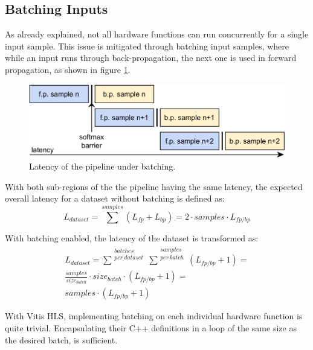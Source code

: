 \subsection{Batching Inputs}
As already explained, not all hardware functions can run concurrently for a single input sample. This issue is mitigated through batching input samples, where while an input runs through back-propagation, the next one is used in forward propagation, as shown in figure \ref{fig: Batching Pipeline latency}. %

\begin{figure}[H]
    \centering
        \includegraphics[width=\textwidth]{Images/diagrams/pipeline_under_batching.png}
        \decoRule
        \caption[Pipeline with batching latency]{Latency of the pipeline under batching.}
        \label{fig: Batching Pipeline latency}
\end{figure}

With both sub-regions of the the pipeline having the same latency, the expected overall latency for a dataset without batching is defined as: %
\begin{equation}
L_{dataset} = \sum^{samples}( L_{fp} + L_{bp} ) = 2 \cdot samples \cdot L_{fp/bp}
	\label{eqn: latency dataset no batching}
\end{equation}

With batching enabled, the latency of the dataset is transformed as:
\begin{equation}
    \begin{gathered}
        L_{dataset} = \sum^{\substack{batches\\ per\ dataset}}\sum^{\substack{samples\\ per\ batch}}( L_{fp/bp} + 1 ) =\\
        \frac{samples}{size_{batch}} \cdot size_{batch} \cdot ( L_{fp/bp} + 1 ) =\\
        samples \cdot ( L_{fp/bp} + 1 )
    \end{gathered}
	\label{eqn: latency dataset with batching}
\end{equation}

With Vitis HLS, implementing batching on each individual hardware function is quite trivial. Encapsulating their C++ definitions in a loop of the same size as the desired batch, is sufficient. %

